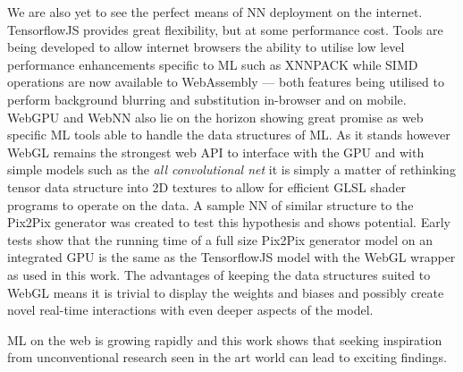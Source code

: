 \documentclass{article}
\begin{document}
We are also yet to see the perfect means of NN deployment on the internet. TensorflowJS provides great flexibility, but at some performance cost. Tools are being developed to allow internet browsers the ability to utilise low level performance enhancements specific to ML such as XNNPACK\cite{XNNPACK} while SIMD operations are now available to WebAssembly\cite{SIMD} --- both features being utilised to perform background blurring and substitution in-browser and on mobile\cite{google_background}. WebGPU\cite{webgpu} and WebNN\cite{webnn} also lie on the horizon showing great promise as web specific ML tools able to handle the data structures of ML. As it stands however WebGL remains the strongest web API to interface with the GPU and with simple models such as the \textit{all convolutional net} it is simply a matter of rethinking tensor data structure into 2D textures to allow for efficient GLSL shader programs to operate on the data. A sample NN of similar structure to the Pix2Pix generator was created to test this hypothesis and shows potential. Early tests show that the running time of a full size Pix2Pix generator model on an integrated GPU is the same as the TensorflowJS model with the WebGL wrapper as used in this work. The advantages of keeping the data structures suited to WebGL means it is trivial to display the weights and biases and possibly create novel real-time interactions with even deeper aspects of the model.

ML on the web is growing rapidly and this work shows that seeking inspiration from unconventional research seen in the art world can lead to exciting findings.


\medskip
\printbibliography
\end{document}
